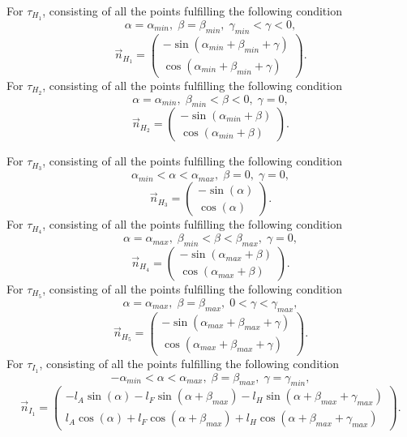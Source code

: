 For $\tau_{H_1}$, consisting of all the points fulfilling the following condition
\[
   \alpha=\alpha_{min},\;
   \beta=\beta_{min},\;
   \gamma_{min} < \gamma < 0,
\]
%
\[
\vec n_{H_1} =
\begin{pmatrix}
 -\sin(\alpha_{min} + \beta_{min} + \gamma) \\
  \cos(\alpha_{min} + \beta_{min} + \gamma)
\end{pmatrix}.
\]
%
For $\tau_{H_2}$, consisting of all the points fulfilling the following condition
\[
 \alpha=\alpha_{min},\;
 \beta_{min} < \beta < 0,\;
 \gamma=0,
\]
\[
\vec n_{H_2} =
\begin{pmatrix}
 -\sin(\alpha_{min} + \beta) \\
  \cos(\alpha_{min} + \beta)
\end{pmatrix}.
\]


For $\tau_{H_3}$, consisting of all the points fulfilling the following condition
\[
\alpha_{min} < \alpha < \alpha_{max}, \;
\beta=0, \;
\gamma=0,
\]
%
\[
\vec n_{H_3} =
\begin{pmatrix}
 -\sin(\alpha) \\
  \cos(\alpha)
\end{pmatrix}.
\]
%
For $\tau_{H_4}$, consisting of all the points fulfilling the following condition
\[
  \alpha=\alpha_{max},\;
  \beta_{min} < \beta < \beta_{max},\;
  \gamma = 0,
\]
%
\[
\vec n_{H_4} =
\begin{pmatrix}
 -\sin(\alpha_{max} + \beta) \\
  \cos(\alpha_{max} + \beta)
\end{pmatrix}.
\]
For $\tau_{H_5}$, consisting of all the points fulfilling the following condition
\[
  \alpha = \alpha_{max}, \;
  \beta = \beta_{max},\;
  0 < \gamma < \gamma_{max},
\]
%
\[
\vec n_{H_5} =
\begin{pmatrix}
 -\sin(\alpha_{max} + \beta_{max} + \gamma) \\
  \cos(\alpha_{max} + \beta_{max} + \gamma)
\end{pmatrix}.
\]
For $\tau_{I_1}$, consisting of all the points fulfilling the following condition
%
\[
 -\alpha_{min} < \alpha < \alpha_{max}, \;
 \beta = \beta_{max},\;
 \gamma=\gamma_{min},
\]
%
%
\[
\vec n_{I_1} =
\begin{pmatrix}
 -l_A \sin(\alpha) - l_F \sin(\alpha + \beta_{max}) - l_H\sin(\alpha+\beta_{max} + \gamma_{max}) \\
 l_A \cos(\alpha) + l_F \cos(\alpha + \beta_{max}) + l_H\cos(\alpha+\beta_{max} + \gamma_{max})
\end{pmatrix}.
\]
